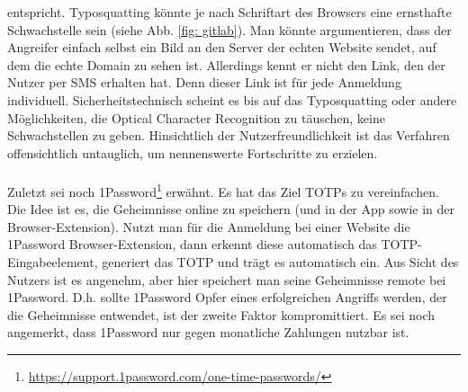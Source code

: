 entspricht. Typosquatting könnte je nach Schriftart des Browsers eine ernsthafte Schwachstelle 
sein (siehe Abb. \ref{fig: gitlab}). Man könnte argumentieren, dass der Angreifer einfach selbst 
ein Bild an den Server der echten Website sendet, auf dem die echte Domain zu sehen ist. 
Allerdings kennt er nicht den Link, den der Nutzer per SMS erhalten hat. Denn dieser Link ist für 
jede Anmeldung individuell. Sicherheitstechnisch scheint es bis auf das Typosquatting oder andere 
Möglichkeiten, die Optical Character Recognition zu täuschen, keine Schwachstellen zu geben. 
Hinsichtlich der Nutzerfreundlichkeit ist das Verfahren offensichtlich untauglich, um 
nennenswerte Fortschritte zu erzielen.
\\\\
Zuletzt sei noch 
1Password\footnote{\href{https://support.1password.com/one-time-passwords/}{https://support.1password.com/one-time-passwords/}} 
erwähnt. Es hat das Ziel TOTPs zu vereinfachen. Die Idee ist es, die Geheimnisse online zu 
speichern (und in der App sowie in der Browser-Extension). Nutzt man für die Anmeldung bei einer 
Website die 1Password Browser-Extension, dann erkennt diese automatisch das TOTP-Eingabeelement, 
generiert das TOTP und trägt es automatisch ein. Aus Sicht des Nutzers ist es  angenehm, 
aber hier speichert man seine Geheimnisse remote bei 1Password. D.h. sollte 1Password Opfer eines 
erfolgreichen Angriffs werden, der die Geheimnisse entwendet, ist der zweite Faktor 
kompromittiert. Es sei noch angemerkt, dass 1Password nur gegen monatliche Zahlungen nutzbar ist.